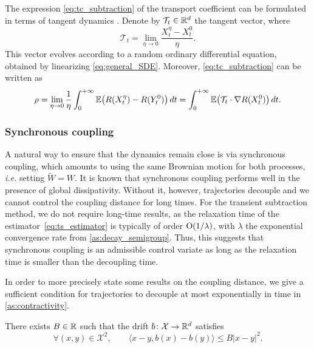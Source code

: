\begin{remark}
%
The expression \eqref{eq:tc_subtraction} of the transport coefficient can be formulated in terms of tangent dynamics \cite{assaraf2017}. Denote by $\mathcal{T}_t\in\mathbb{R}^d$ the tangent vector, where
%
\begin{equation}
	\mathcal{T}_t 
	= \lim_{\eta\to 0} \frac{X_t^\eta - X_t^0}{\eta}.
\end{equation} 
%
This vector evolves according to a random ordinary differential equation, obtained by linearizing \eqref{eq:general_SDE}. Moreover,
\eqref{eq:tc_subtraction} can be written as
%
\begin{equation}
	\rho = \lim_{\eta\to 0} \frac{1}{\eta}\int_0^{+\infty} \E\paren*{R(X_t^\eta) - R(Y_t^0)} \, dt = \int_0^{+\infty} \E\paren*{\mathcal{T}_t\cdot \nabla R(X_t^0)} \, dt.
\end{equation}
%
\end{remark}

\subsubsection{Synchronous coupling}
\label{subsubsec:synchronous_coup}
%
A natural way to ensure that the dynamics remain close is via synchronous coupling, which amounts to using the same Brownian motion for both processes, \emph{i.e.} setting $\widetilde{W} = W$. It is known that synchronous coupling performs well in the presence of global dissipativity. Without it, however, trajectories decouple and we cannot control the coupling distance for long times. For the transient subtraction method, we do not require long-time results, as the relaxation time of the estimator~\eqref{eq:ts_estimator} is typically of order $\mathrm{O}(1/\lambda)$, with $\lambda$ the exponential convergence rate from \cref{as:decay_semigroup}. Thus, this suggests that synchronous coupling is an admissible control variate as long as the relaxation time is smaller than the decoupling time.

In order to more precisely state some results on the coupling distance, we give a sufficient condition for trajectories to decouple at most exponentially in time in \cref{as:contractivity}. %
 
\begin{assumption}
\label{as:contractivity}
	There exists $B\in\mathbb{R}$ such that the drift $b\colon \mathcal{X} \to \mathbb{R}^d$ satisfies
	\begin{equation}
		\forall (x,y) \in \mathcal{X}^2, \qquad \langle x-y, b(x)-b(y)\rangle \leq B|x-y|^2.
		\label{eq:no_dissip}
	\end{equation}
	
\end{assumption}

